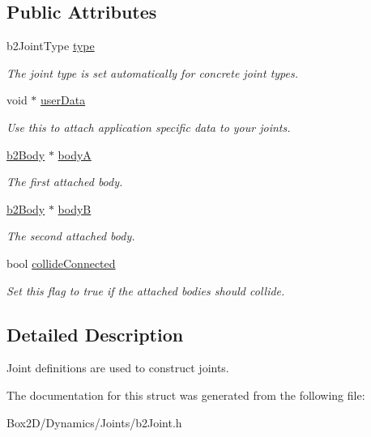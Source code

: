 \subsection*{Public Attributes}
\begin{DoxyCompactItemize}
\item 
\mbox{\label{structb2_joint_def_a470f2879b24adb05facbd49f338856fb}} 
b2\+Joint\+Type \hyperlink{structb2_joint_def_a470f2879b24adb05facbd49f338856fb}{type}
\begin{DoxyCompactList}\small\item\em The joint type is set automatically for concrete joint types. \end{DoxyCompactList}\item 
\mbox{\label{structb2_joint_def_a07eb150daaaa52fc09c3bcf402b295fe}} 
void $\ast$ \hyperlink{structb2_joint_def_a07eb150daaaa52fc09c3bcf402b295fe}{user\+Data}
\begin{DoxyCompactList}\small\item\em Use this to attach application specific data to your joints. \end{DoxyCompactList}\item 
\mbox{\label{structb2_joint_def_a8cd54c93da396be75a9788f2c6897f05}} 
\hyperlink{classb2_body}{b2\+Body} $\ast$ \hyperlink{structb2_joint_def_a8cd54c93da396be75a9788f2c6897f05}{bodyA}
\begin{DoxyCompactList}\small\item\em The first attached body. \end{DoxyCompactList}\item 
\mbox{\label{structb2_joint_def_aa4f4dee2fbcd12187b19506b60e68e3d}} 
\hyperlink{classb2_body}{b2\+Body} $\ast$ \hyperlink{structb2_joint_def_aa4f4dee2fbcd12187b19506b60e68e3d}{bodyB}
\begin{DoxyCompactList}\small\item\em The second attached body. \end{DoxyCompactList}\item 
\mbox{\label{structb2_joint_def_aef099a1f89b64e230173b6016848ea9b}} 
bool \hyperlink{structb2_joint_def_aef099a1f89b64e230173b6016848ea9b}{collide\+Connected}
\begin{DoxyCompactList}\small\item\em Set this flag to true if the attached bodies should collide. \end{DoxyCompactList}\end{DoxyCompactItemize}


\subsection{Detailed Description}
Joint definitions are used to construct joints. 

The documentation for this struct was generated from the following file\+:\begin{DoxyCompactItemize}
\item 
Box2\+D/\+Dynamics/\+Joints/b2\+Joint.\+h\end{DoxyCompactItemize}

